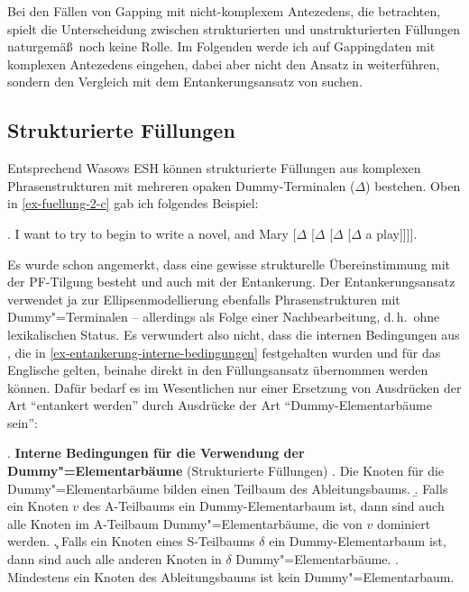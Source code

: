 Bei den Fällen von Gapping mit nicht-komplexem Antezedens, die \cite{Seddah:Sagot:06} betrachten, spielt die Unterscheidung zwischen strukturierten und unstrukturierten Füllungen naturgemä\ss\ noch keine Rolle. Im Folgenden werde ich auf Gappingdaten mit komplexen Antezedens eingehen, dabei aber nicht den Ansatz in \cite{Seddah:Sagot:06} weiterführen, sondern den Vergleich mit dem Entankerungsansatz von \cite{Lichte:Kallmeyer:10} suchen.
 

\subsection{Strukturierte Füllungen}  

Entsprechend Wasows ESH können strukturierte Füllungen aus komplexen Phrasenstrukturen mit mehreren opaken Dummy-Terminalen ($\Delta$) bestehen. Oben in \ref{ex-fuellung-2-c} gab ich folgendes Beispiel:

\ex. I want to try to begin to write a novel, and Mary [$\Delta$ [$\Delta$ [$\Delta$ [$\Delta$  a play]]]].\label{ex-fuellung-2-c-wdh}  

Es wurde schon angemerkt, dass eine gewisse strukturelle Übereinstimmung mit der PF-Til\-gung besteht \citep[6]{Winkler:Schwabe:03} und auch mit der Entankerung. Der Entankerungsansatz verwendet ja zur Ellipsenmodellierung ebenfalls Phrasenstrukturen mit Dummy"=Terminalen -- allerdings als Folge einer Nachbearbeitung, d.\,h.\ ohne lexikalischen Status. Es verwundert also nicht, dass die internen Bedingungen aus \cite{Lichte:Kallmeyer:10}, die in \ref{ex-entankerung-interne-bedingungen} festgehalten wurden und für das Englische gelten, beinahe direkt in den Füllungsansatz übernommen werden können. Dafür bedarf es im Wesentlichen nur einer Ersetzung von Ausdrücken der Art "`entankert werden"' durch Ausdrücke der Art "`Dummy-Elementarbäume sein"':      

\ex. {\bf Interne Bedingungen für die Verwendung der Dummy"=Elementarbäume} (Strukturierte Füllungen) \label{ex-fuellung-interne-bedingungen-1}
\a. Die Knoten für die Dummy"=Elementarbäume bilden einen Teilbaum des Ableitungsbaums.
\b. Falls ein Knoten $v$ des A-Teilbaums ein Dummy-Elementarbaum ist, dann sind auch alle Knoten im A-Teilbaum Dummy"=Elementarbäume, die von $v$ dominiert werden.
\c. Falls ein Knoten eines S-Teilbaums $\delta$ ein Dummy-Elementarbaum ist, dann sind auch alle anderen Knoten in $\delta$ Dummy"=Elementarbäume.
\e. Mindestens ein Knoten des Ableitungsbaums ist kein Dummy"=Elementarbaum.


